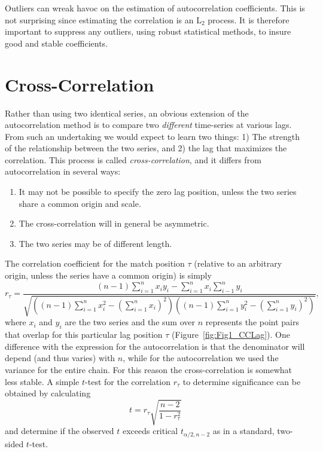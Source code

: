 Outliers can wreak havoc on the estimation of autocorrelation coefficients.  This is not surprising since estimating the
correlation is an L$_2$ process.  It is therefore important to suppress any outliers, using robust 
statistical methods, to insure good and stable coefficients.

\section{Cross-Correlation}

	Rather than using two identical series, an obvious extension of the autocorrelation method is to
compare two \emph{different} time-series at various lags.  From such an undertaking we would expect to learn 
two things: 1) The strength of the relationship between the two series, and 2) the lag that 
maximizes the correlation.  This process is called \emph{cross-correlation}, and it differs from 
autocorrelation in several ways:
\begin{enumerate}
\item It may not be possible to specify the zero lag position, unless the two series share a common 
origin and scale.
\item The cross-correlation will in general be asymmetric.
\item The two series may be of different length.
\end{enumerate}
The correlation coefficient for the match position $\tau$ (relative to an arbitrary origin, unless the series have a 
common origin) is simply
\begin{equation}
r_{\tau} = \frac{(n-1) \displaystyle \sum ^n_{i=1} x_i y_i - \sum^n_{i=1} x_i \sum ^n _{i-1} y_i}
{\sqrt{ \left ( (n-1) \displaystyle \sum ^n_{i=1} x_i ^2 - \left (\displaystyle \sum ^n_{i=1} x_i \right )^2 \right ) \left ( (n-1)
\displaystyle \sum ^n_{i=1} y_i^2 - \left ( \displaystyle \sum ^n_{i=1} y_i \right )^2 \right )  }},
\end{equation}
where $x_i$ and $y_i$ are the two series and the sum over $n$ represents the point pairs that overlap
for this particular lag position $\tau$ (Figure~\ref{fig:Fig1_CCLag}). One difference with 
the expression for the autocorrelation is that the denominator will depend (and thus varies) with $n$, while for 
the autocorrelation we used the variance for the entire chain.  
For this reason the cross-correlation is somewhat less stable.  A simple $t$-test for the correlation $r_{\tau}$
to determine significance can be obtained by calculating
\begin{equation}
	t = r_{\tau} \sqrt{\frac{n-2}{1-r_{\tau}^2}}
\end{equation}
and determine if the observed $t$ exceeds critical $t_{\alpha/2,n-2}$ as in a standard, two-sided $t$-test.

